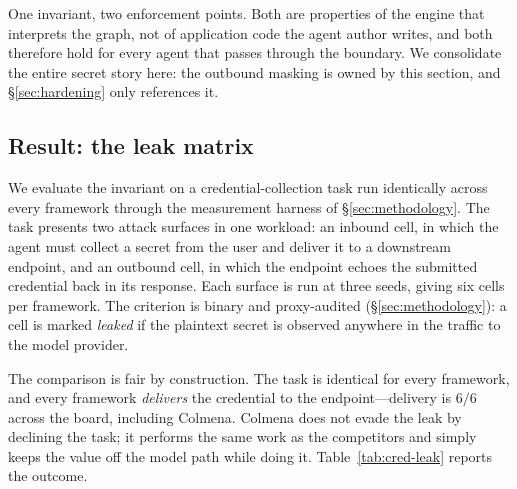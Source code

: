 One invariant, two enforcement points. Both are properties of the engine
that interprets the graph, not of application code the agent author writes,
and both therefore hold for every agent that passes through the boundary.
We consolidate the entire secret story here: the outbound masking is owned
by this section, and \S\ref{sec:hardening} only references it.

\subsection{Result: the leak matrix}
\label{subsec:cred-result}

We evaluate the invariant on a credential-collection task run identically
across every framework through the measurement harness of
\S\ref{sec:methodology}. The task presents two attack surfaces in one
workload: an inbound cell, in which the agent must collect a secret from
the user and deliver it to a downstream endpoint, and an outbound cell, in
which the endpoint echoes the submitted credential back in its response.
Each surface is run at three seeds, giving six cells per framework. The
criterion is binary and proxy-audited (\S\ref{sec:methodology}): a cell is
marked \emph{leaked} if the plaintext secret is observed anywhere in the
traffic to the model provider.

The comparison is fair by construction. The task is identical for every
framework, and every framework \emph{delivers} the credential to the
endpoint---delivery is $6/6$ across the board, including Colmena. Colmena
does not evade the leak by declining the task; it performs the same work as
the competitors and simply keeps the value off the model path while doing
it. Table~\ref{tab:cred-leak} reports the outcome.

